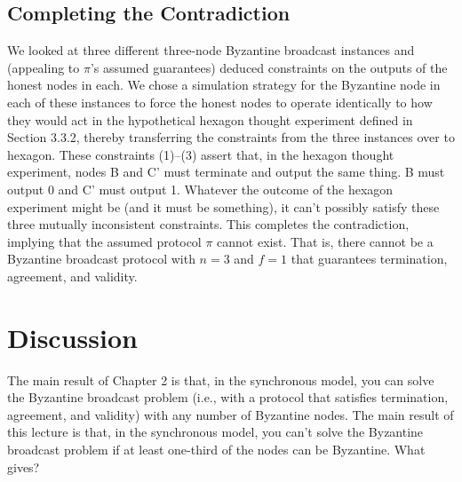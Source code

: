 \subsection{Completing the Contradiction}
We looked at three different three-node Byzantine broadcast instances and (appealing to
$\pi$’s assumed guarantees) deduced constraints on the outputs of the honest nodes in each.
We chose a simulation strategy for the Byzantine node in each of these instances to force
the honest nodes to operate identically to how they would act in the hypothetical hexagon
thought experiment defined in Section 3.3.2, thereby transferring the constraints from the three
instances over to hexagon. These constraints (1)–(3) assert that, in the hexagon thought
experiment, nodes B and C' must terminate and output the same thing. B must output 0
and C' must output 1. Whatever the outcome of the hexagon experiment might be (and it
must be something), it can’t possibly satisfy these three mutually inconsistent constraints.
This completes the contradiction, implying that the assumed protocol $\pi$ cannot exist. That
is, there cannot be a Byzantine broadcast protocol with $n = 3$ and $f = 1$ that guarantees
termination, agreement, and validity.

\section{Discussion}
The main result of Chapter 2 is that, in the synchronous model, you can solve the Byzantine
broadcast problem (i.e., with a protocol that satisfies termination, agreement, and validity)
with any number of Byzantine nodes. The main result of this lecture is that, in the synchronous model, you can’t solve the Byzantine broadcast problem if at least one-third of the nodes can be Byzantine. What gives?

